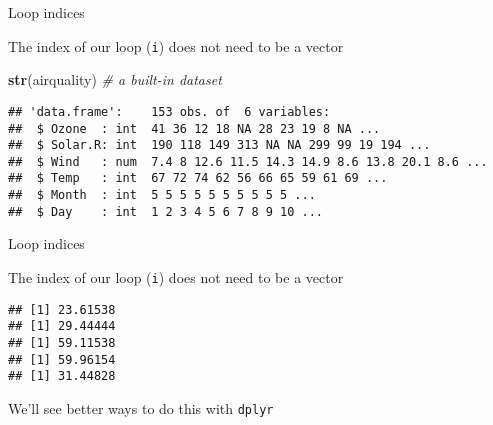 \documentclass[ignorenonframetext,]{beamer}
\newenvironment{Shaded}{\begin{snugshade}}{\end{snugshade}}
\newcommand{\CommentTok}[1]{\textcolor[rgb]{0.56,0.35,0.01}{\textit{#1}}}
\newcommand{\ControlFlowTok}[1]{\textcolor[rgb]{0.13,0.29,0.53}{\textbf{#1}}}
\newcommand{\DataTypeTok}[1]{\textcolor[rgb]{0.13,0.29,0.53}{#1}}
\newcommand{\KeywordTok}[1]{\textcolor[rgb]{0.13,0.29,0.53}{\textbf{#1}}}
\newcommand{\NormalTok}[1]{#1}
\newcommand{\OperatorTok}[1]{\textcolor[rgb]{0.81,0.36,0.00}{\textbf{#1}}}
\newcommand{\OtherTok}[1]{\textcolor[rgb]{0.56,0.35,0.01}{#1}}
\newcommand{\StringTok}[1]{\textcolor[rgb]{0.31,0.60,0.02}{#1}}
\begin{document}
\begin{frame}[fragile]{Loop indices}
\protect\hypertarget{loop-indices}{}

The index of our loop (\texttt{i}) does not need to be a vector

\begin{Shaded}
\begin{Highlighting}[]
\KeywordTok{str}\NormalTok{(airquality) }\CommentTok{# a built-in dataset}
\end{Highlighting}
\end{Shaded}

\begin{verbatim}
## 'data.frame':    153 obs. of  6 variables:
##  $ Ozone  : int  41 36 12 18 NA 28 23 19 8 NA ...
##  $ Solar.R: int  190 118 149 313 NA NA 299 99 19 194 ...
##  $ Wind   : num  7.4 8 12.6 11.5 14.3 14.9 8.6 13.8 20.1 8.6 ...
##  $ Temp   : int  67 72 74 62 56 66 65 59 61 69 ...
##  $ Month  : int  5 5 5 5 5 5 5 5 5 5 ...
##  $ Day    : int  1 2 3 4 5 6 7 8 9 10 ...
\end{verbatim}

\end{frame}

\begin{frame}[fragile]{Loop indices}
\protect\hypertarget{loop-indices-1}{}

The index of our loop (\texttt{i}) does not need to be a vector

\begin{Shaded}
\end{Shaded}

\begin{verbatim}
## [1] 23.61538
## [1] 29.44444
## [1] 59.11538
## [1] 59.96154
## [1] 31.44828
\end{verbatim}

We'll see better ways to do this with \texttt{dplyr}

\end{frame}
\end{document}
